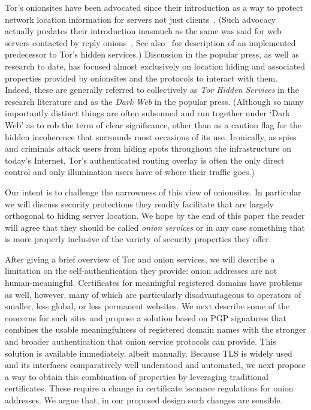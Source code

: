 \documentclass[10pt, conference, compsocconf]{styles/IEEEtran}
\begin{document}
Tor's onionsites have been advocated since their introduction as a way
to protect network location information for servers not just
clients~\cite{tor-design}. (Such advocacy actually predates their
introduction inasmuch as the same was said for web servers contacted
by reply onions~\cite{onion-routing:cacm99}, See also~\cite{rewebber}
for description of an implemented predecessor to Tor's hidden
services.)  Discussion in the popular press, as well as research to
date, has focused almost exclusively on location hiding and associated
properties provided by onionsites and the protocols to interact with
them. Indeed, these are generally referred to collectively as
\emph{Tor Hidden Services} in the research literature and as the
\emph{Dark Web} in the popular press. (Although so many importantly
distinct things are often subsumed and run together under `Dark Web'
as to rob the term of clear significance, other than as a caution flag
for the hidden incoherence that surrounds most occasions of its
use. Ironically, as spies and criminals attack users from hiding spots
throughout the infrastructure on today's Internet, Tor's
authenticated routing overlay is often the only direct control and
only illumination users have of where their traffic goes.)

Our intent is to challenge the narrowness of this view of
onionsites. In particular we will discuss security protections they
readily facilitate that are largely orthogonal to hiding server
location. We hope by the end of this paper the reader will agree that
they should be called \emph{onion services} or in any
case something that is more properly inclusive of the variety of
security properties they offer.


After giving a brief overview of Tor and onion services, we will
describe a limitation on the self-authentication they provide: onion
addresses are not human-meaningful. Certificates for meaningful
registered domains have problems as well, however, many of which are
particularly disadvantageous to operators of smaller, less global, or
less permanent websites.  We next describe some of the concerns for
such sites and propose a solution based on PGP signatures that
combines the usable meaningfulness of registered domain names with the
stronger and broader authentication that onion service protocols can
provide.  This solution is available immediately, albeit manually.
Because TLS is widely used and its interfaces comparatively well
understood and automated, we next propose a way to obtain this
combination of properties by leveraging traditional certificates.
These require a change in certificate issuance regulations for onion
addresses.  We argue that, in our proposed design such changes are
sensible.
\end{document}
